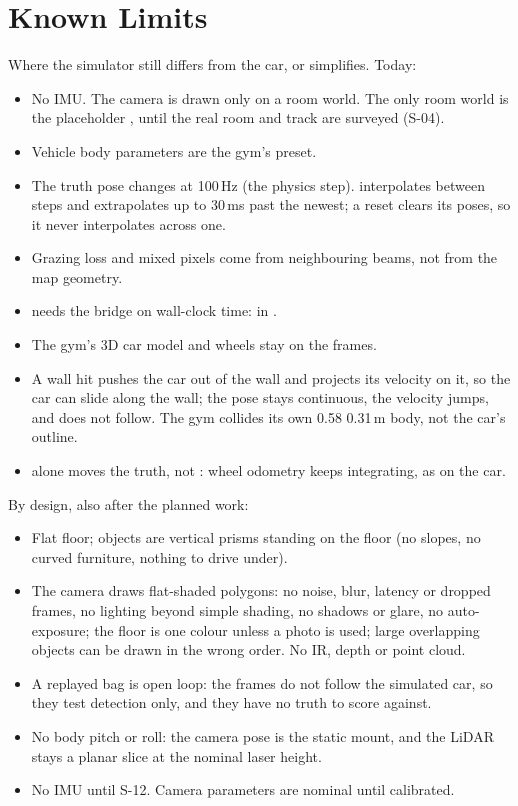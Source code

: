 \documentclass[11pt,a4paper]{article}
\begin{document}
\section{Known Limits}
Where the simulator still differs from the car, or simplifies. Today:
\begin{itemize}
  \item No IMU. The camera is drawn only on a room world. The only room world is the placeholder , until the real room and track are surveyed (S-04).
  \item Vehicle body parameters are the gym's  preset.
  \item The truth pose changes at 100\,Hz (the physics step).  interpolates between steps and extrapolates up to 30\,ms past the newest; a reset clears its poses, so it never interpolates across one.
  \item Grazing loss and mixed pixels come from neighbouring beams, not from the map geometry.
  \item {} needs the bridge on wall-clock time:  in .
  \item The gym's 3D car model and wheels stay on the  frames.
  \item A wall hit pushes the car out of the wall and projects its velocity on it, so the car can slide along the wall; the pose stays continuous, the velocity jumps, and  does not follow. The gym collides its own 0.58\,\x\,0.31\,m body, not the car's outline.
  \item {} alone moves the truth, not : wheel odometry keeps integrating, as on the car.
\end{itemize}
By design, also after the planned work:
\begin{itemize}
  \item Flat floor; objects are vertical prisms standing on the floor (no slopes, no curved furniture, nothing to drive under).
  \item The camera draws flat-shaded polygons: no noise, blur, latency or dropped frames, no lighting beyond simple shading, no shadows or glare, no auto-exposure; the floor is one colour unless a photo is used; large overlapping objects can be drawn in the wrong order. No IR, depth or point cloud.
  \item A replayed bag is open loop: the frames do not follow the simulated car, so they test detection only, and they have no truth to score against.
  \item No body pitch or roll: the camera pose is the static mount, and the LiDAR stays a planar slice at the nominal laser height.
  \item No IMU until S-12. Camera parameters are nominal until calibrated.
\end{itemize}
\end{document}
